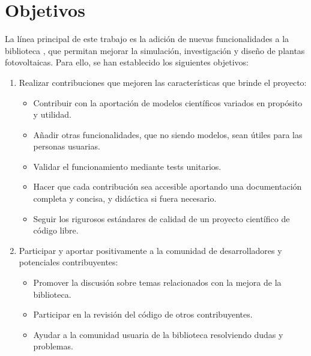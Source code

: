 \section{Objetivos} \label{sct:intro:objetivos}

La línea principal de este trabajo es la adición de nuevas funcionalidades a la biblioteca \pvlibpy, que permitan mejorar la simulación, investigación y diseño de plantas fotovoltaicas. Para ello, se han establecido los siguientes objetivos:

\begin{enumerate}

    \item Realizar contribuciones que mejoren las características que brinde el proyecto:
    
    \begin{itemize}
        \item Contribuir con la aportación de modelos científicos variados en propósito y utilidad.

        \item Añadir otras funcionalidades, que no siendo modelos, sean útiles para las personas usuarias.
    
        \item Validar el funcionamiento mediante tests unitarios.
    
        \item Hacer que cada contribución sea accesible aportando una documentación completa y concisa, y didáctica si fuera necesario.
    
        \item Seguir los rigurosos estándares de calidad de un proyecto científico de código libre.
    \end{itemize}

    \item Participar y aportar positivamente a la comunidad de desarrolladores y potenciales contribuyentes:
    
    \begin{itemize}
        \item Promover la discusión sobre temas relacionados con la mejora de la biblioteca.

        \item Participar en la revisión del código de otros contribuyentes.
    
        \item Ayudar a la comunidad usuaria de la biblioteca resolviendo dudas y problemas.
    

\end{itemize}
\end{enumerate}

